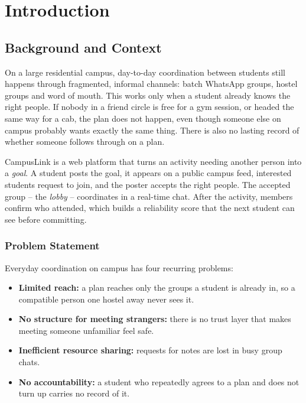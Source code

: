 \documentclass[twoside,12pt]{tietreport}
\author{%
  \texttt{1024030968} Govind \\
  \texttt{1024030096} Ashish Bajaj \\
  \texttt{1024030099} Divya \\
  \texttt{1024030064} Divyansh%
}
\begin{document}
\maketitle
\tableofcontents

\chapter{Introduction}

\section{Background and Context}

On a large residential campus, day-to-day coordination between students still
happens through fragmented, informal channels: batch WhatsApp groups, hostel
groups and word of mouth. This works only when a student already knows the right
people. If nobody in a friend circle is free for a gym session, or headed the
same way for a cab, the plan does not happen, even though someone else on campus
probably wants exactly the same thing. There is also no lasting record of whether
someone follows through on a plan.

CampusLink is a web platform that turns an activity needing another person into a
\emph{goal}. A student posts the goal, it appears on a public campus feed,
interested students request to join, and the poster accepts the right people. The
accepted group -- the \emph{lobby} -- coordinates in a real-time chat. After the
activity, members confirm who attended, which builds a reliability score that the
next student can see before committing.

\subsection{Problem Statement}

Everyday coordination on campus has four recurring problems:

\begin{itemize}
  \item \textbf{Limited reach:} a plan reaches only the groups a student is
    already in, so a compatible person one hostel away never sees it.
  \item \textbf{No structure for meeting strangers:} there is no trust layer that
    makes meeting someone unfamiliar feel safe.
  \item \textbf{Inefficient resource sharing:} requests for notes are lost in busy
    group chats.
  \item \textbf{No accountability:} a student who repeatedly agrees to a plan and
    does not turn up carries no record of it.
\end{itemize}
\end{document}
